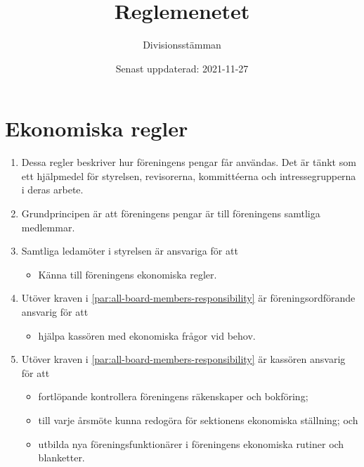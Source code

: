 \documentclass{dvd}
\begin{document}
	\title{Reglemenetet}
	\author{Divisionsstämman}
	\date{Senast uppdaterad: 2021-11-27}

\section{Ekonomiska regler}

	\begin{enumerate}[label=\arabic* §, ref=\arabic*]
		\item Dessa regler beskriver hur föreningens pengar får användas.
		Det är tänkt som ett hjälpmedel för styrelsen, revisorerna, kommittéerna och intressegrupperna i deras arbete.

		\item Grundprincipen är att föreningens pengar är till föreningens samtliga medlemmar.

		\item Samtliga ledamöter i styrelsen är ansvariga för att

		\begin{itemize}
			\item Känna till föreningens ekonomiska regler.
		\end{itemize}
		\label{par:all-board-members-responsibility}

		\item Utöver kraven i \ref{par:all-board-members-responsibility} är föreningsordförande ansvarig för att

		\begin{itemize}
			\item hjälpa kassören med ekonomiska frågor vid behov.
		\end{itemize}

		\item Utöver kraven i \ref{par:all-board-members-responsibility} är kassören ansvarig för att

		\begin{itemize}

			\item fortlöpande kontrollera föreningens räkenskaper och bokföring;

			\item till varje årsmöte kunna redogöra för sektionens ekonomiska ställning; och

			\item utbilda nya föreningsfunktionärer i föreningens ekonomiska rutiner och blanketter.

		\end{itemize}


\end{enumerate}
\end{document}
